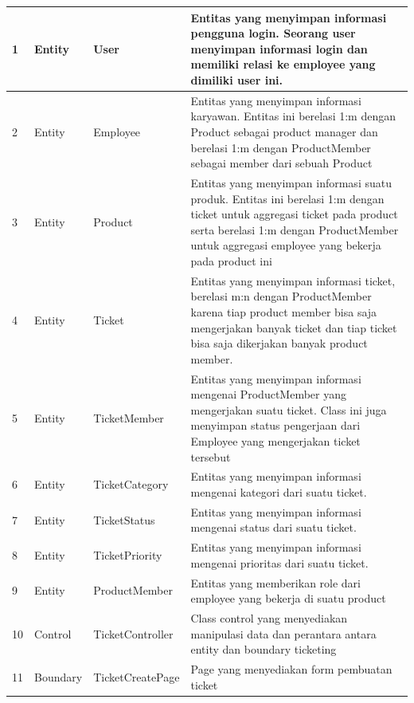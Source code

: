 \documentclass[12pt]{article}
\begin{document}
\begin{enumerate}[label=\textbf{4.\arabic*.}]
\begin{enumerate} [label=\textbf{4.2.\arabic*.}, wide, labelwidth=!, labelindent=0pt]
\begin{enumerate}[label=\textbf{4.3.\arabic*.}]
\begin{longtable}{ |l|l|l|p{}| }
                    1 & Entity & User & Entitas yang menyimpan informasi pengguna login. Seorang user menyimpan informasi login dan memiliki relasi ke employee yang dimiliki user ini.\\
                    \hline
                    2 & Entity & Employee & Entitas yang menyimpan informasi karyawan. Entitas ini berelasi 1:m dengan Product sebagai product manager dan berelasi 1:m dengan ProductMember sebagai member dari sebuah Product \\
                    \hline
                    3 & Entity & Product & Entitas yang menyimpan informasi suatu produk. Entitas ini berelasi 1:m dengan ticket untuk aggregasi ticket pada product serta berelasi 1:m dengan ProductMember untuk aggregasi employee yang bekerja pada product ini \\
                    \hline
                    4 & Entity & Ticket & Entitas yang menyimpan informasi ticket, berelasi m:n dengan ProductMember karena tiap product member bisa saja mengerjakan banyak ticket dan tiap ticket bisa saja dikerjakan banyak product member. \\
                    \hline
                    5 & Entity & TicketMember & Entitas yang menyimpan informasi mengenai ProductMember yang mengerjakan suatu ticket. Class ini juga menyimpan status pengerjaan dari Employee yang mengerjakan ticket tersebut \\
                    \hline
                    6 & Entity & TicketCategory & Entitas yang menyimpan informasi mengenai kategori dari suatu ticket. \\
                    \hline
                    7 & Entity & TicketStatus & Entitas yang menyimpan informasi mengenai status dari suatu ticket. \\
                    \hline
                    8 & Entity & TicketPriority & Entitas yang menyimpan informasi mengenai prioritas dari suatu ticket. \\
                    \hline
                    9 & Entity & ProductMember & Entitas yang memberikan role dari employee yang bekerja di suatu product \\
                    \hline
                    10 & Control & TicketController & Class control yang menyediakan manipulasi data dan perantara antara entity dan boundary ticketing \\
                    \hline
                    11 & Boundary & TicketCreatePage & Page yang menyediakan form pembuatan ticket \\

\end{longtable}
\end{enumerate}
\end{enumerate}
\end{enumerate}
\end{document}
